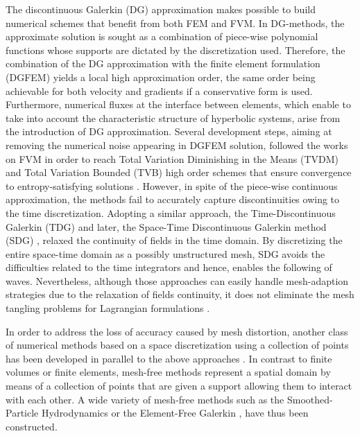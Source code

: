 The discontinuous Galerkin (DG) approximation \cite{NeutronDG} makes possible to build numerical schemes that benefit from both FEM and FVM.
In DG-methods, the approximate solution is sought as a combination of piece-wise polynomial functions whose supports are dictated by the discretization used.
Therefore, the combination of the DG approximation with the finite element formulation (DGFEM) yields a local high approximation order, the same order being achievable for both velocity and gradients if a conservative form is used.
Furthermore, numerical fluxes at the interface between elements, which enable to take into account the characteristic structure of hyperbolic systems, arise from the introduction of DG approximation.
Several development steps, aiming at removing the numerical noise appearing in DGFEM solution, followed the works on FVM in order to reach Total Variation Diminishing in the Means (TVDM) and Total Variation Bounded (TVB) high order schemes that ensure convergence to entropy-satisfying solutions \cite{Cockburn}.
However, in spite of the piece-wise continuous approximation, the methods fail to accurately capture discontinuities owing to the time discretization.
Adopting a similar approach, the Time-Discontinuous Galerkin (TDG) \cite{Hughes_TDG} and later, the Space-Time Discontinuous Galerkin method (SDG) \cite{ST_DGFEM1}, relaxed the continuity of fields in the time domain. 
By discretizing the entire space-time domain as a possibly unstructured mesh, SDG avoids the difficulties related to the time integrators and hence, enables the following of waves.
Nevertheless, although those approaches can easily handle mesh-adaption strategies due to the relaxation of fields continuity, it does not eliminate the mesh tangling problems for Lagrangian formulations \cite{FVilar_DG}.

In order to address the loss of accuracy caused by mesh distortion, another class of numerical methods based on a space discretization using a collection of points has been developed in parallel to the above approaches \cite{Belytschko_Meshless,Meshless}.
In contrast to finite volumes or finite elements, mesh-free methods represent a spatial domain by means of a collection of points that are given a support allowing them to interact with each other.
A wide variety of mesh-free methods such as the Smoothed-Particle Hydrodynamics \cite{SPH} or the Element-Free Galerkin \cite{Belytschko_EFG}, have thus been constructed.

